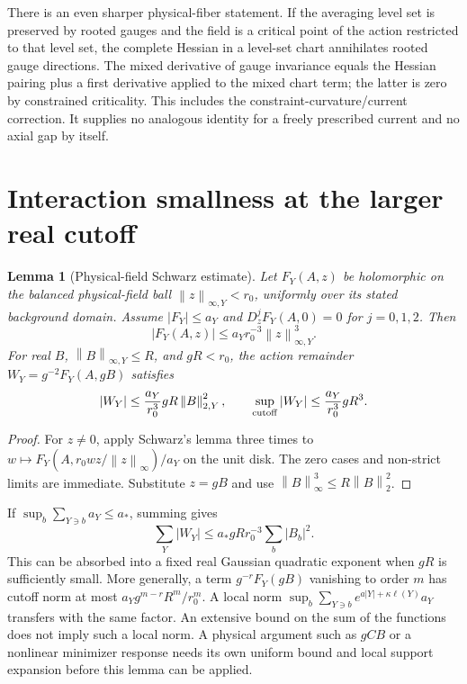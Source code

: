 \documentclass[11pt]{article}
\newtheorem{lemma}[theorem]{Lemma}
\theoremstyle{remark}
\newcommand{\norm}[1]{\left\|#1\right\|}
\begin{document}
There is an even sharper physical-fiber statement. If the averaging
level set is preserved by rooted gauges and the field is a critical
point of the action restricted to that level set, the complete Hessian
in a level-set chart annihilates rooted gauge directions. The mixed
derivative of gauge invariance equals the Hessian pairing plus a first
derivative applied to the mixed chart term; the latter is zero by
constrained criticality. This includes the constraint-curvature/current
correction. It supplies no analogous identity for a freely prescribed
current and no axial gap by itself.

\section{Interaction smallness at the larger real cutoff}

\begin{lemma}[Physical-field Schwarz estimate]\label{lem:schwarz}
Let $F_Y(A,z)$ be holomorphic on the balanced physical-field ball
$\norm z_{\infty,Y}<r_0$, uniformly over its stated background domain.
Assume $|F_Y|\le a_Y$ and $D_z^jF_Y(A,0)=0$ for $j=0,1,2$.
Then
\[
 |F_Y(A,z)|\le a_Yr_0^{-3}\norm z_{\infty,Y}^3.
\]
For real $B$, $\norm B_{\infty,Y}\le R$, and $gR<r_0$, the
action remainder $W_Y=g^{-2}F_Y(A,gB)$ satisfies
\begin{equation}\label{eq:cubic-stability}
 |W_Y|\le\frac{a_Y}{r_0^3}gR\norm B_{2,Y}^2,
 \qquad \sup_{\rm cutoff}|W_Y|\le\frac{a_Y}{r_0^3}gR^3.
\end{equation}
\end{lemma}

\begin{proof}
For $z\ne0$, apply Schwarz's lemma three times to
$w\mapsto F_Y(A,r_0wz/\norm z_\infty)/a_Y$ on the unit disk.
The zero cases and non-strict limits are immediate. Substitute $z=gB$
and use $\norm B_\infty^3\le R\norm B_2^2$.
\end{proof}

If $\sup_b\sum_{Y\ni b}a_Y\le a_*$, summing gives
\[
 \sum_Y|W_Y|\le a_*gRr_0^{-3}\sum_b|B_b|^2.
\]
This can be absorbed into a fixed real Gaussian quadratic exponent
when $gR$ is sufficiently small. More generally, a term
$g^{-r}F_Y(gB)$ vanishing to order $m$ has cutoff norm at most
$a_Yg^{m-r}R^m/r_0^m$. A local norm
$\sup_b\sum_{Y\ni b}e^{a|Y|+\kappa\ell(Y)}a_Y$ transfers with
the same factor. An extensive bound on the sum of the functions does
not imply such a local norm. A physical argument such as $gCB$ or a
nonlinear minimizer response needs its own uniform bound and local
support expansion before this lemma can be applied.
\end{document}
